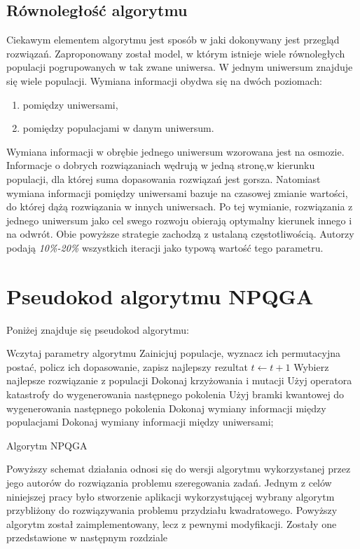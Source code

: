 \subsection{Równoległość algorytmu}
Ciekawym elementem algorytmu jest sposób w jaki dokonywany jest przegląd rozwiązań. Zaproponowany został model, w którym istnieje wiele równoległych populacji pogrupowanych w tak zwane uniwersa. W jednym uniwersum znajduje się wiele populacji. Wymiana informacji obydwa się na dwóch poziomach:
\begin{enumerate}
\item pomiędzy uniwersami,
\item pomiędzy populacjami w danym uniwersum.
\end{enumerate}

Wymiana informacji w obrębie jednego uniwersum wzorowana jest na osmozie. Informacje o dobrych rozwiązaniach wędrują w jedną stronę,w kierunku populacji, dla której suma dopasowania rozwiązań jest gorsza. Natomiast wymiana informacji pomiędzy uniwersami bazuje na czasowej zmianie wartości, do której dążą rozwiązania w innych uniwersach. Po tej wymianie, rozwiązania z jednego uniwersum jako cel swego rozwoju obierają optymalny kierunek innego i na odwrót.
Obie powyższe strategie zachodzą z ustalaną częstotliwością. Autorzy podają \textit{10\%-20\%} wszystkich iteracji jako typową wartość tego parametru. 

\section{Pseudokod algorytmu NPQGA}
Poniżej znajduje się pseudokod algorytmu:
\newpage
\begin{algorithm}[H]
	Wczytaj parametry algorytmu\;
	Zainicjuj populacje, wyznacz ich permutacyjna postać, policz ich dopasowanie, zapisz najlepszy rezultat\;
 	{
 		$t\leftarrow t+1$\;
  		{
  			Wybierz najlepsze rozwiązanie z populacji\;
  			Dokonaj krzyżowania i mutacji\;
  			{
  				Użyj operatora katastrofy do wygenerowania następnego pokolenia\;
  			}
  			\Else
  			{
  				Użyj bramki kwantowej do wygenerowania następnego pokolenia\;
  			}
  		}
  		{
  			Dokonaj wymiany informacji między populacjami\;
  		}
  		{
  			Dokonaj wymiany informacji między uniwersami;
  		}
 	}
 	\caption{Algorytm NPQGA}
\end{algorithm}

Powyższy schemat działania odnosi się do wersji algorytmu wykorzystanej przez jego autorów do rozwiązania problemu szeregowania zadań. Jednym z celów niniejszej pracy było stworzenie aplikacji wykorzystującej wybrany algorytm przybliżony do rozwiązywania problemu przydziału kwadratowego. Powyższy algorytm został zaimplementowany, lecz z pewnymi modyfikacji. Zostały one przedstawione w następnym rozdziale
